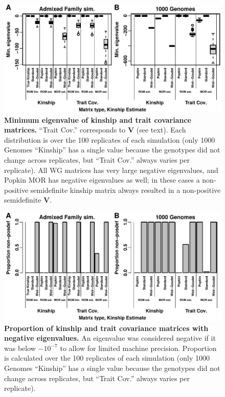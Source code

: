 \documentclass[11pt]{article}
\begin{document}
\begin{figure}[bp!]
  \centering
  \includegraphics[width=\textwidth]{emin.pdf}
  \caption{
    {\bf Minimum eigenvalue of kinship and trait covariance matrices.}
    ``Trait Cov.'' corresponds to $\mathbf{V}$ (see text).
    Each distribution is over the 100 replicates of each simulation (only 1000 Genomes ``Kinship'' has a single value because the genotypes did not change across replicates, but ``Trait Cov.'' always varies per replicate).
    All WG matrices has very large negative eigenvalues, and Popkin MOR has negative eigenvalues as well; in these cases a non-positive semidefinite kinship matrix always resulted in a non-positive semidefinite $\mathbf{V}$.
  }
  \label{fig:emin}
\end{figure}

\begin{figure}[bp!]
  \centering
  \includegraphics[width=\textwidth]{emin-cut.pdf}
  \caption{
    {\bf Proportion of kinship and trait covariance matrices with negative eigenvalues.}
    An eigenvalue was considered negative if it was below $-10^{-7}$ to allow for limited machine precision.
    Proportion is calculated over the 100 replicates of each simulation (only 1000 Genomes ``Kinship'' has a single value because the genotypes did not change across replicates, but ``Trait Cov.'' always varies per replicate).
  }
  \label{fig:emin-cut}
\end{figure}
\end{document}

